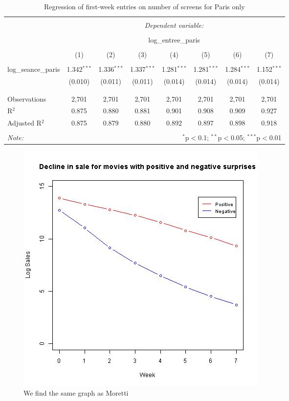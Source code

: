 \begin{table}[!htbp] \centering 
	\caption{Regression of first-week entries on number of screens for Paris only} 
	\label{part2.1_tab4} 
	\begin{tabular}{@{\extracolsep{5pt}}lccccccc} 
		\\[-1.8ex]\hline 
		\hline \\[-1.8ex] 
		& \multicolumn{7}{c}{\textit{Dependent variable:}} \\ 
		\cline{2-8} 
		\\[-1.8ex] & \multicolumn{7}{c}{log\_entree\_paris} \\ 
		\\[-1.8ex] & (1) & (2) & (3) & (4) & (5) & (6) & (7)\\ 
		\hline \\[-1.8ex] 
		log\_seance\_paris & 1.342$^{***}$ & 1.336$^{***}$ & 1.337$^{***}$ & 1.281$^{***}$ & 1.281$^{***}$ & 1.284$^{***}$ & 1.152$^{***}$ \\ 
		& (0.010) & (0.011) & (0.011) & (0.014) & (0.014) & (0.014) & (0.014) \\ 
		& & & & & & & \\ 
		\hline \\[-1.8ex] 
		Observations & 2,701 & 2,701 & 2,701 & 2,701 & 2,701 & 2,701 & 2,701 \\ 
		R$^{2}$ & 0.875 & 0.880 & 0.881 & 0.901 & 0.908 & 0.909 & 0.927 \\ 
		Adjusted R$^{2}$ & 0.875 & 0.879 & 0.880 & 0.892 & 0.897 & 0.898 & 0.918 \\ 
		\hline 
		\hline \\[-1.8ex] 
		\textit{Note:}  & \multicolumn{7}{r}{$^{*}$p$<$0.1; $^{**}$p$<$0.05; $^{***}$p$<$0.01} \\ 
	\end{tabular} 
\end{table} 
\begin{figure}\centering
	\caption{We find the same graph as Moretti}
	\label{part2.1_plot_moretti}
	\includegraphics[scale=0.5]{plot_moretti.png}
\end{figure}
